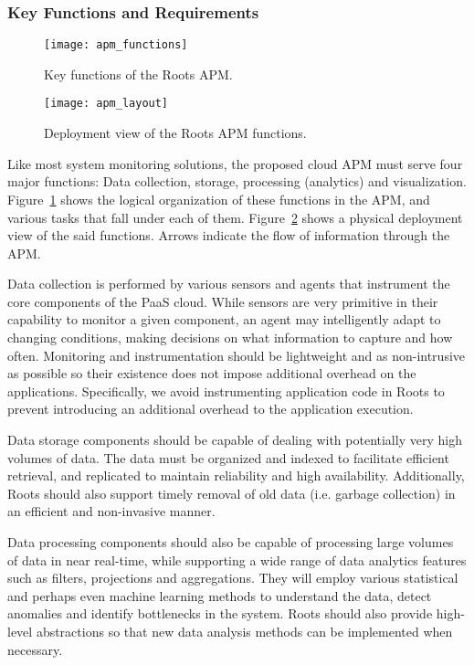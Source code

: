\subsubsection{Key Functions and Requirements}
\begin{figure}
\centering
\texttt{[image: apm\_functions]}
\caption{Key functions of the Roots APM.}
\label{fig:apm_functions}
\end{figure}

\begin{figure}
\centering
\texttt{[image: apm\_layout]}
\caption{Deployment view of the Roots APM functions.}
\label{fig:apm_layout}
\end{figure}

Like most system monitoring solutions, the proposed cloud APM must serve four major functions: Data
collection, storage, processing (analytics) and visualization. Figure~\ref{fig:apm_functions} shows the
logical organization of these functions in the APM, and various tasks that fall under each of them.
Figure~\ref{fig:apm_layout} shows a physical deployment view of the said functions. Arrows indicate
the flow of information through the APM.

Data collection is performed by various sensors and agents that instrument the
core components of the PaaS cloud.
While sensors are very primitive in their capability to monitor
a given component, an agent may intelligently adapt to changing conditions, making decisions on
what information to capture and how often. 
Monitoring and instrumentation should be lightweight and as non-intrusive
as possible so their existence does not impose additional overhead 
on the applications. Specifically, we avoid instrumenting application code in Roots to prevent
introducing an additional overhead to the application execution. 

Data storage components should be capable of
dealing with potentially very high volumes of data. The data must be organized and indexed
to facilitate efficient retrieval, and replicated to maintain reliability and high availability. 
Additionally, Roots should also support timely removal of old data (i.e. garbage collection)
in an efficient and non-invasive manner.

Data processing components should also be capable of processing large volumes of data in near real-time,
while supporting a wide range of data analytics features such as filters, projections and aggregations. 
They will employ various statistical and perhaps even machine learning methods to understand the
data, detect anomalies and identify bottlenecks in the system. Roots should also provide high-level
abstractions so that new data analysis methods can be implemented when necessary.

